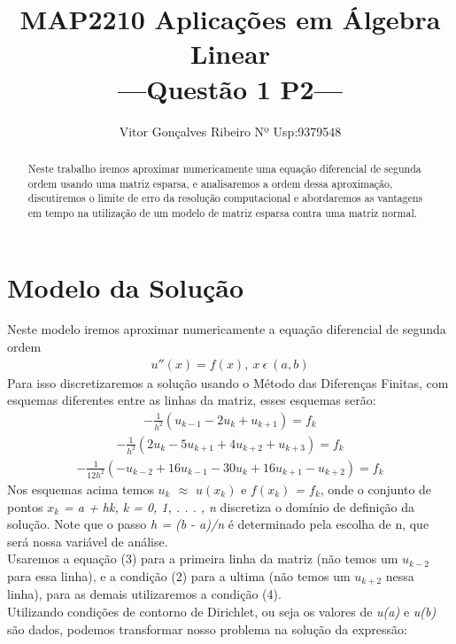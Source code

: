 \documentclass[a4paper,10pt]{article}
\title{MAP2210 Aplicações em Álgebra Linear \\ ---Questão 1 P2---}
\author{Vitor Gonçalves Ribeiro Nº Usp:9379548}
\begin{document}
\maketitle

\begin{abstract} 
   Neste trabalho iremos aproximar numericamente uma equação diferencial de segunda ordem usando uma matriz esparsa, e analisaremos a ordem dessa aproximação, discutiremos o limite de erro da resolução computacional e abordaremos as vantagens em tempo na utilização de um modelo de matriz esparsa contra uma matriz normal.
\end{abstract}

\section{Modelo da Solução}
  Neste modelo iremos aproximar numericamente a equação diferencial de segunda ordem
  \begin{eqnarray}
  	u''(x) = f(x),\ x\ \epsilon\ (a,b)
  \end{eqnarray}
  Para isso discretizaremos a solução usando o Método das Diferenças Finitas, com esquemas diferentes entre as linhas da matriz, esses esquemas serão:
  \begin{eqnarray}
  	-\frac{1}{h^2}(u_{k-1} -2u_k + u_{k+1} ) = f_k
  \end{eqnarray}
  \begin{eqnarray}
    -\frac{1}{h^2}(2u_{k} -5u_{k+1} + 4u_{k+2} + u_{k+3} ) = f_k
  \end{eqnarray}
  \begin{eqnarray}
    -\frac{1}{12h^2}(-u_{k-2} +16u_{k-1} -30u_k + 16u_{k+1} - u_{k+2}) = f_k
  \end{eqnarray}
  Nos esquemas acima temos \textit{$u_k$ $\approx$ $u(x_k)$} e \textit{$f(x_k)$
  = $f_k$}, onde o conjunto de
  pontos \textit{$x_k$ = a + hk, k = 0, 1, . . . , n} discretiza o domínio de definição da solução.
  Note que o passo \textit{h = (b - a)/n} é determinado pela escolha de n, que será nossa variável de análise.\\
  Usaremos a equação (3) para a primeira linha da matriz (não temos um $u_{k-2}$ para essa linha), e a condição (2) para a ultima (não temos um $u_{k+2}$ nessa linha), para as demais utilizaremos a condição (4).\\
  Utilizando condições de contorno de Dirichlet, ou seja os valores de \textit{u(a)} e \textit{u(b)} são dados, podemos transformar nosso problema na solução da expressão:\\
\end{document}
